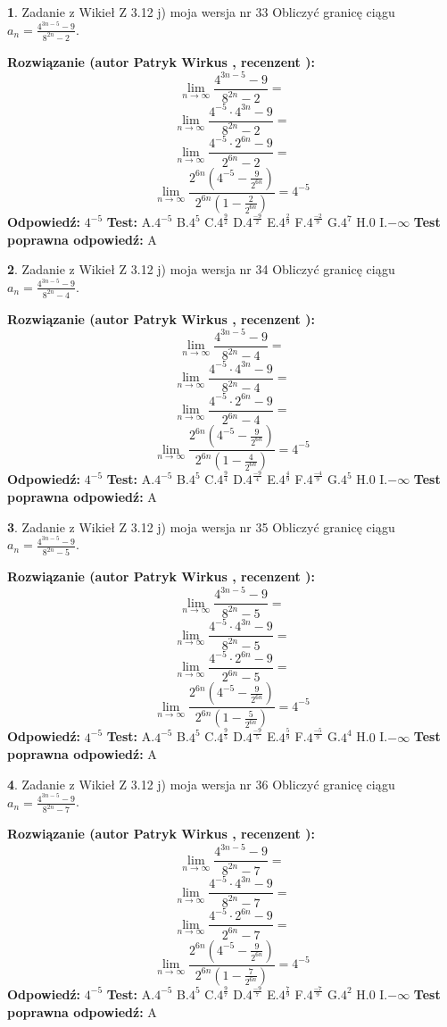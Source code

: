 \documentclass[12pt, a4paper]{article}
\theoremstyle{definition} %
\newtheorem{zad}{}
\newcommand{\zadStart}[1]{\begin{zad}#1\newline}
\newcommand{\zadStop}{\end{zad}}
\newcommand{\rozwStart}[2]{\noindent \textbf{Rozwiązanie (autor #1 , recenzent #2): }\newline}
\newcommand{\rozwStop}{\newline}
\newcommand{\odpStart}{\noindent \textbf{Odpowiedź:}\newline}
\newcommand{\odpStop}{\newline}
\newcommand{\testStart}{\noindent \textbf{Test:}\newline}
\newcommand{\testStop}{\newline}
\newcommand{\kluczStart}{\noindent \textbf{Test poprawna odpowiedź:}\newline}
\newcommand{\kluczStop}{\newline}
\begin{document}
\zadStart{Zadanie z Wikieł Z 3.12 j) moja wersja nr 33}
Obliczyć granicę ciągu $a_{n}=\frac{4^{3n-5}-9}{8^{2n}-2}$.
\zadStop
\rozwStart{Patryk Wirkus}{}
$$\lim\limits_{n\to\infty}\frac{4^{3n-5}-9}{8^{2n}-2}=$$
$$\lim\limits_{n\to\infty}\frac{4^{-5} \cdot 4^{3n}-9}{8^{2n}-2}=$$
$$\lim\limits_{n\to\infty}\frac{4^{-5} \cdot 2^{6n}-9}{2^{6n}-2}=$$
$$\lim\limits_{n\to\infty}\frac{2^{6n}(4^{-5} - \frac{9}{2^{6n}})}{2^{6n}(1-\frac{2}{2^{6n}})}= 4^{-5}$$
\rozwStop
\odpStart
$4^{-5}$
\odpStop
\testStart
A.$4^{-5}$
B.$4^{5}$
C.$4^{\frac{9}{2}}$
D.$4^{\frac{-9}{2}}$
E.$4^{\frac{2}{9}}$
F.$4^{\frac{-2}{9}}$
G.$4^{7}$
H.$0$
I.$-\infty$
\testStop
\kluczStart
A
\kluczStop



\zadStart{Zadanie z Wikieł Z 3.12 j) moja wersja nr 34}
Obliczyć granicę ciągu $a_{n}=\frac{4^{3n-5}-9}{8^{2n}-4}$.
\zadStop
\rozwStart{Patryk Wirkus}{}
$$\lim\limits_{n\to\infty}\frac{4^{3n-5}-9}{8^{2n}-4}=$$
$$\lim\limits_{n\to\infty}\frac{4^{-5} \cdot 4^{3n}-9}{8^{2n}-4}=$$
$$\lim\limits_{n\to\infty}\frac{4^{-5} \cdot 2^{6n}-9}{2^{6n}-4}=$$
$$\lim\limits_{n\to\infty}\frac{2^{6n}(4^{-5} - \frac{9}{2^{6n}})}{2^{6n}(1-\frac{4}{2^{6n}})}= 4^{-5}$$
\rozwStop
\odpStart
$4^{-5}$
\odpStop
\testStart
A.$4^{-5}$
B.$4^{5}$
C.$4^{\frac{9}{4}}$
D.$4^{\frac{-9}{4}}$
E.$4^{\frac{4}{9}}$
F.$4^{\frac{-4}{9}}$
G.$4^{5}$
H.$0$
I.$-\infty$
\testStop
\kluczStart
A
\kluczStop



\zadStart{Zadanie z Wikieł Z 3.12 j) moja wersja nr 35}
Obliczyć granicę ciągu $a_{n}=\frac{4^{3n-5}-9}{8^{2n}-5}$.
\zadStop
\rozwStart{Patryk Wirkus}{}
$$\lim\limits_{n\to\infty}\frac{4^{3n-5}-9}{8^{2n}-5}=$$
$$\lim\limits_{n\to\infty}\frac{4^{-5} \cdot 4^{3n}-9}{8^{2n}-5}=$$
$$\lim\limits_{n\to\infty}\frac{4^{-5} \cdot 2^{6n}-9}{2^{6n}-5}=$$
$$\lim\limits_{n\to\infty}\frac{2^{6n}(4^{-5} - \frac{9}{2^{6n}})}{2^{6n}(1-\frac{5}{2^{6n}})}= 4^{-5}$$
\rozwStop
\odpStart
$4^{-5}$
\odpStop
\testStart
A.$4^{-5}$
B.$4^{5}$
C.$4^{\frac{9}{5}}$
D.$4^{\frac{-9}{5}}$
E.$4^{\frac{5}{9}}$
F.$4^{\frac{-5}{9}}$
G.$4^{4}$
H.$0$
I.$-\infty$
\testStop
\kluczStart
A
\kluczStop



\zadStart{Zadanie z Wikieł Z 3.12 j) moja wersja nr 36}
Obliczyć granicę ciągu $a_{n}=\frac{4^{3n-5}-9}{8^{2n}-7}$.
\zadStop
\rozwStart{Patryk Wirkus}{}
$$\lim\limits_{n\to\infty}\frac{4^{3n-5}-9}{8^{2n}-7}=$$
$$\lim\limits_{n\to\infty}\frac{4^{-5} \cdot 4^{3n}-9}{8^{2n}-7}=$$
$$\lim\limits_{n\to\infty}\frac{4^{-5} \cdot 2^{6n}-9}{2^{6n}-7}=$$
$$\lim\limits_{n\to\infty}\frac{2^{6n}(4^{-5} - \frac{9}{2^{6n}})}{2^{6n}(1-\frac{7}{2^{6n}})}= 4^{-5}$$
\rozwStop
\odpStart
$4^{-5}$
\odpStop
\testStart
A.$4^{-5}$
B.$4^{5}$
C.$4^{\frac{9}{7}}$
D.$4^{\frac{-9}{7}}$
E.$4^{\frac{7}{9}}$
F.$4^{\frac{-7}{9}}$
G.$4^{2}$
H.$0$
I.$-\infty$
\testStop
\kluczStart
A
\kluczStop
\end{document}
